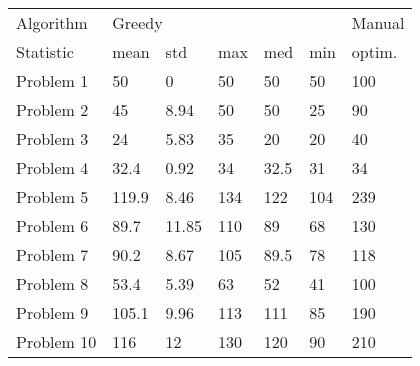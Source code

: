 \begin{tabular}{lllllll}
\toprule
Algorithm & \multicolumn{5}{l}{Greedy} & Manual \\
Statistic &   mean &    std &  max &   med &  min & optim. \\
\midrule
Problem 1  &     50 &      0 &   50 &    50 &   50 &    100 \\
Problem 2  &     45 &   8.94 &   50 &    50 &   25 &     90 \\
Problem 3  &     24 &   5.83 &   35 &    20 &   20 &     40 \\
Problem 4  &   32.4 &   0.92 &   34 &  32.5 &   31 &     34 \\
Problem 5  &  119.9 &   8.46 &  134 &   122 &  104 &    239 \\
Problem 6  &   89.7 &  11.85 &  110 &    89 &   68 &    130 \\
Problem 7  &   90.2 &   8.67 &  105 &  89.5 &   78 &    118 \\
Problem 8  &   53.4 &   5.39 &   63 &    52 &   41 &    100 \\
Problem 9  &  105.1 &   9.96 &  113 &   111 &   85 &    190 \\
Problem 10 &    116 &     12 &  130 &   120 &   90 &    210 \\
\bottomrule
\end{tabular}
